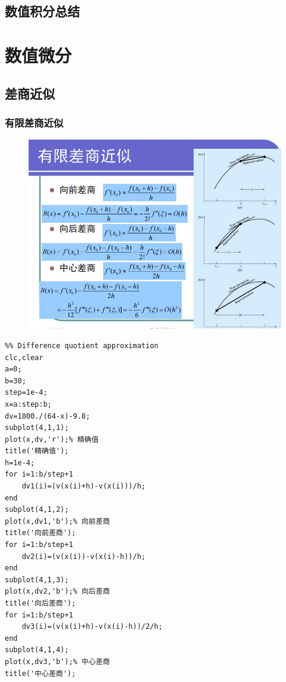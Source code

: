 \documentclass[a4paper,12pt]{ctexart}
\begin{document}
\subsection{数值积分总结}


\section{数值微分}
\subsection{差商近似}
\subsubsection{有限差商近似}
\begin{figure}[H]
    \centering
    \includegraphics[width=14cm]{第五章作业/chashang.jpg}
\end{figure}
\begin{lstlisting}
%% Difference quotient approximation
clc,clear
a=0;
b=30;
step=1e-4;
x=a:step:b;
dv=1800./(64-x)-9.8;
subplot(4,1,1);
plot(x,dv,'r');% 精确值
title('精确值');
h=1e-4;
for i=1:b/step+1
    dv1(i)=(v(x(i)+h)-v(x(i)))/h;
end
subplot(4,1,2);
plot(x,dv1,'b');% 向前差商
title('向前差商');
for i=1:b/step+1
    dv2(i)=(v(x(i))-v(x(i)-h))/h;
end
subplot(4,1,3);
plot(x,dv2,'b');% 向后差商
title('向后差商');
for i=1:b/step+1
    dv3(i)=(v(x(i)+h)-v(x(i)-h))/2/h;
end
subplot(4,1,4);
plot(x,dv3,'b');% 中心差商
title('中心差商');
\end{lstlisting}
\end{document}
